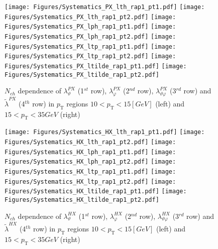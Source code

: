 \documentclass[12pt]{article}
\newcommand{\pT}{p_\mathrm{T}}
\newcommand{\lamthHX}{\lambda^{\scriptscriptstyle HX}_\vartheta}
\newcommand{\lamphHX}{\lambda^{\scriptscriptstyle HX}_\varphi}
\newcommand{\lamthphHX}{\lambda^{\scriptscriptstyle HX}_{\vartheta \varphi}}
\newcommand{\lamtildeHX}{\tilde{\lambda}^{\scriptscriptstyle HX}}
\newcommand{\lamthPX}{\lambda^{\scriptscriptstyle PX}_\vartheta}
\newcommand{\lamphPX}{\lambda^{\scriptscriptstyle PX}_\varphi}
\newcommand{\lamthphPX}{\lambda^{\scriptscriptstyle PX}_{\vartheta \varphi}}
\newcommand{\lamtildePX}{\tilde{\lambda}^{\scriptscriptstyle PX}}
\begin{document}



\begin{figure}[htbp]
\centering
\texttt{[image: Figures/Systematics\_PX\_lth\_rap1\_pt1.pdf]}
\texttt{[image: Figures/Systematics\_PX\_lth\_rap1\_pt2.pdf]}
\texttt{[image: Figures/Systematics\_PX\_lph\_rap1\_pt1.pdf]}
\texttt{[image: Figures/Systematics\_PX\_lph\_rap1\_pt2.pdf]}
\texttt{[image: Figures/Systematics\_PX\_ltp\_rap1\_pt1.pdf]}
\texttt{[image: Figures/Systematics\_PX\_ltp\_rap1\_pt2.pdf]}
\texttt{[image: Figures/Systematics\_PX\_ltilde\_rap1\_pt1.pdf]}
\texttt{[image: Figures/Systematics\_PX\_ltilde\_rap1\_pt2.pdf]}
\caption{$N_{ch}$ dependence of $\lamthPX$
(1$^{st}$ row), $\lamphPX$ (2$^{nd}$ row), $\lamthphPX$ (3$^{rd}$ row) and 
$\lamtildePX$ (4$^{th}$ row) in $\pT$ regions $10 < \pT < 15 [GeV]$ (left) and
$15 < \pT < 35 GeV$ (right)}
\end{figure}
\clearpage







\begin{figure}[htbp]
\centering
\texttt{[image: Figures/Systematics\_HX\_lth\_rap1\_pt1.pdf]} 
\texttt{[image: Figures/Systematics\_HX\_lth\_rap1\_pt2.pdf]}
\texttt{[image: Figures/Systematics\_HX\_lph\_rap1\_pt1.pdf]}
\texttt{[image: Figures/Systematics\_HX\_lph\_rap1\_pt2.pdf]}
\texttt{[image: Figures/Systematics\_HX\_ltp\_rap1\_pt1.pdf]}
\texttt{[image: Figures/Systematics\_HX\_ltp\_rap1\_pt2.pdf]}
\texttt{[image: Figures/Systematics\_HX\_ltilde\_rap1\_pt1.pdf]}
\texttt{[image: Figures/Systematics\_HX\_ltilde\_rap1\_pt2.pdf]}
\caption{$N_{ch}$ dependence of $\lamthHX$
(1$^{st}$ row), $\lamphHX$ (2$^{nd}$ row), $\lamthphHX$ (3$^{rd}$ row) and 
$\lamtildeHX$ (4$^{th}$ row) in $\pT$ regions $10 < \pT < 15 [GeV]$ (left) and
$15 < \pT < 35 GeV$ (right)}
\end{figure}
\clearpage



\end{document}
